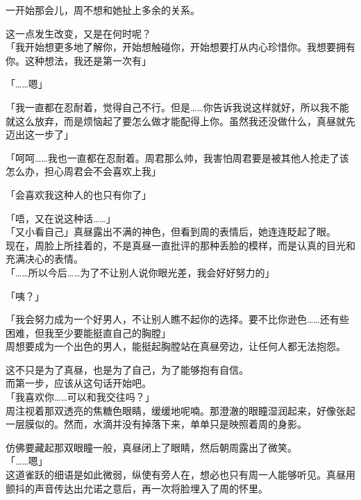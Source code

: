 一开始那会儿，周不想和她扯上多余的关系。

这一点发生改变，又是在何时呢？\\

「我开始想更多地了解你，开始想触碰你，开始想要打从内心珍惜你。我想要拥有你。这种想法，我还是第一次有」

「……嗯」

「我一直都在忍耐着，觉得自己不行。但是……你告诉我说这样就好，所以我不能就这么放弃，而是烦恼起了要怎么做才能配得上你。虽然我还没做什么，真昼就先迈出这一步了」

「呵呵……我也一直都在忍耐着。周君那么帅，我害怕周君要是被其他人抢走了该怎么办，担心周君会不会喜欢上我」

「会喜欢我这种人的也只有你了」

「唔，又在说这种话……」\\

「又小看自己」真昼露出不满的神色，但看到周的表情后，她连连眨起了眼。\\

现在，周脸上所挂着的，不是真昼一直批评的那种丢脸的模样，而是认真的目光和充满决心的表情。\\

「……所以今后……为了不让别人说你眼光差，我会好好努力的」

「咦？」

「我会努力成为一个好男人，不让别人瞧不起你的选择。要不比你逊色……还有些困难，但我至少要能挺直自己的胸膛」\\

周想要成为一个出色的男人，能挺起胸膛站在真昼旁边，让任何人都无法抱怨。

这不只是为了真昼，也是为了自己，为了能够抱有自信。\\

而第一步，应该从这句话开始吧。\\

「我喜欢你……可以和我交往吗？」\\

周注视着那双透亮的焦糖色眼睛，缓缓地呢喃。那澄澈的眼瞳湿润起来，好像张起一层膜似的。然而，水滴并没有掉落下来，单单只是映照着周的身影。

仿佛要藏起那双眼瞳一般，真昼闭上了眼睛，然后朝周露出了微笑。\\

「……嗯」\\

这道雀跃的细语是如此微弱，纵使有旁人在，想必也只有周一人能够听见。真昼用颤抖的声音传达出允诺之意后，再一次将脸埋入了周的怀里。

